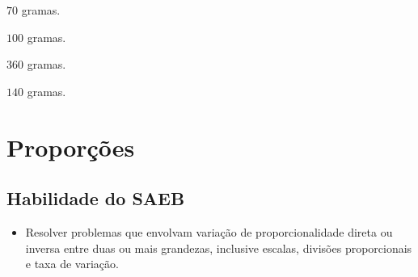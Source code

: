 \begin{escolha}
\item $70$ gramas.
\item $100$ gramas.
\item $360$ gramas.
\item $140$ gramas.
\end{escolha}



\chapter{Proporções}

\section*{Habilidade do SAEB} 
\begin{itemize}
\item Resolver problemas que envolvam variação de
proporcionalidade direta ou inversa entre duas ou mais grandezas,
inclusive escalas, divisões proporcionais e taxa de variação.
\end{itemize}

